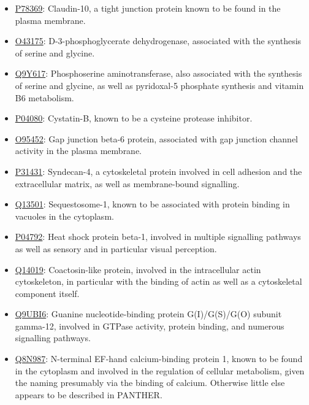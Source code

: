 \begin{itemize}
\item \href{http://www.pantherdb.org/genes/gene.do?acc=HUMAN\%7CHGNC\%3D2033\%7CUniProtKB\%3DP78369}{P78369}: Claudin-10,  a tight junction protein known to be found in the plasma membrane.
\item \href{http://www.pantherdb.org/genes/gene.do?acc=HUMAN\%7CHGNC\%3D8923\%7CUniProtKB\%3DO43175}{O43175}: D-3-phosphoglycerate dehydrogenase, associated with the synthesis of serine and glycine.
\item \href{http://www.pantherdb.org/genes/gene.do?acc=HUMAN\%7CHGNC\%3D19129\%7CUniProtKB\%3DQ9Y617}{Q9Y617}: Phosphoserine aminotransferase, also associated with the synthesis of serine and glycine, as well as pyridoxal-5 phosphate synthesis and vitamin B6 metabolism.
\item \href{http://www.pantherdb.org/genes/gene.do?acc=HUMAN\%7CHGNC\%3D2482\%7CUniProtKB\%3DP04080}{P04080}: Cystatin-B, known to be a cysteine protease inhibitor.
\item \href{http://www.pantherdb.org/genes/gene.do?acc=HUMAN\%7CHGNC\%3D4288\%7CUniProtKB\%3DO95452}{O95452}: Gap junction beta-6 protein, associated with gap junction channel activity in the plasma membrane.
\item \href{http://www.pantherdb.org/genes/gene.do?acc=HUMAN\%7CHGNC\%3D10661\%7CUniProtKB\%3DP31431}{P31431}: Syndecan-4, a cytoskeletal protein involved in cell adhesion and the extracellular matrix, as well as membrane-bound signalling.
\item \href{http://www.pantherdb.org/genes/gene.do?acc=HUMAN\%7CHGNC\%3D11280\%7CUniProtKB\%3DQ13501}{Q13501}: Sequestosome-1, known to be associated with protein binding in vacuoles in the cytoplasm.
\item \href{http://www.pantherdb.org/genes/gene.do?acc=HUMAN\%7CHGNC\%3D5246\%7CUniProtKB\%3DP04792}{P04792}: Heat shock protein beta-1, involved in multiple signalling pathways as well as sensory and in particular visual perception.
\item \href{http://www.pantherdb.org/genes/gene.do?acc=HUMAN\%7CHGNC\%3D18304\%7CUniProtKB\%3DQ14019}{Q14019}: Coactosin-like protein, involved in the intracellular actin cytoskeleton, in particular with the binding of actin as well as a cytoskeletal component itself.
\item \href{http://www.pantherdb.org/genes/gene.do?acc=HUMAN\%7CHGNC\%3D19663\%7CUniProtKB\%3DQ9UBI6}{Q9UBI6}: Guanine nucleotide-binding protein G(I)/G(S)/G(O) subunit gamma-12, involved in GTPase activity, protein binding, and numerous signalling pathways.
\item \href{http://www.pantherdb.org/genes/gene.do?acc=HUMAN\%7CHGNC\%3D20983\%7CUniProtKB\%3DQ8N987}{Q8N987}: N-terminal EF-hand calcium-binding protein 1, known to be found in the cytoplasm and involved in the regulation of cellular metabolism, given the naming presumably via the binding of calcium. Otherwise little else appears to be described in PANTHER.
\end{itemize}

